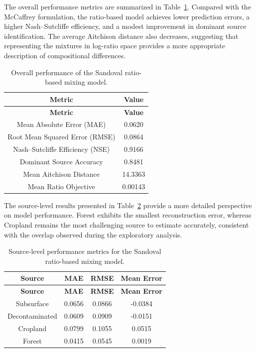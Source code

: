 \documentclass[
  12pt,
  letterpaper,
]{book}
\begin{document}
The overall performance metrics are summarized in
Table~\ref{tbl-sandoval-performance}. Compared with the McCaffrey
formulation, the ratio-based model achieves lower prediction errors, a
higher Nash--Sutcliffe efficiency, and a modest improvement in dominant
source identification. The average Aitchison distance also decreases,
suggesting that representing the mixtures in log-ratio space provides a
more appropriate description of compositional differences.

\begin{longtable}[]{@{}cc@{}}
\caption{Overall performance of the Sandoval ratio-based mixing
model.}\label{tbl-sandoval-performance}\tabularnewline
\toprule\noalign{}
\textbf{Metric} & \textbf{Value} \\
\midrule\noalign{}
\endfirsthead
\toprule\noalign{}
\textbf{Metric} & \textbf{Value} \\
\midrule\noalign{}
\endhead
\bottomrule\noalign{}
\endlastfoot
Mean Absolute Error (MAE) & 0.0620 \\
Root Mean Squared Error (RMSE) & 0.0864 \\
Nash--Sutcliffe Efficiency (NSE) & 0.9166 \\
Dominant Source Accuracy & 0.8481 \\
Mean Aitchison Distance & 14.3363 \\
Mean Ratio Objective & 0.00143 \\
\end{longtable}

The source-level results presented in
Table~\ref{tbl-sandoval-source-metrics} provide a more detailed
perspective on model performance. Forest exhibits the smallest
reconstruction error, whereas Cropland remains the most challenging
source to estimate accurately, consistent with the overlap observed
during the exploratory analysis.

\begin{longtable}[]{@{}cccc@{}}
\caption{Source-level performance metrics for the Sandoval ratio-based
mixing model.}\label{tbl-sandoval-source-metrics}\tabularnewline
\toprule\noalign{}
\textbf{Source} & \textbf{MAE} & \textbf{RMSE} & \textbf{Mean Error} \\
\midrule\noalign{}
\endfirsthead
\toprule\noalign{}
\textbf{Source} & \textbf{MAE} & \textbf{RMSE} & \textbf{Mean Error} \\
\midrule\noalign{}
\endhead
\bottomrule\noalign{}
\endlastfoot
Subsurface & 0.0656 & 0.0866 & -0.0384 \\
Decontaminated & 0.0609 & 0.0909 & -0.0151 \\
Cropland & 0.0799 & 0.1055 & 0.0515 \\
Forest & 0.0415 & 0.0545 & 0.0019 \\
\end{longtable}
\end{document}
